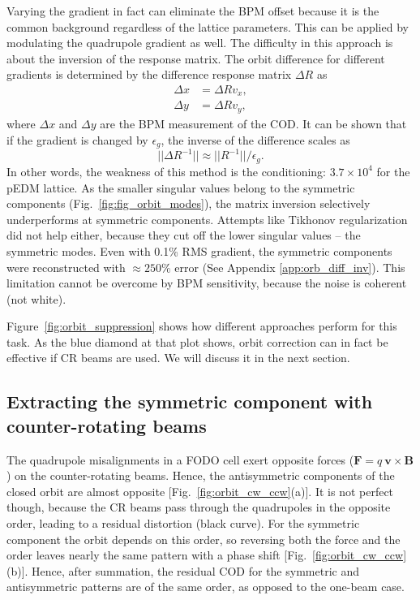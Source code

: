 \documentclass[aps,prab,reprint,superscriptaddress,nofootinbib]{revtex4-2}
\begin{document}
	Varying the gradient in fact can eliminate the BPM offset because it is the common background regardless of the lattice parameters. This can be applied by modulating the quadrupole gradient as well. The difficulty in this approach is about the inversion of the response matrix.
	The orbit difference for different gradients is determined by the difference response matrix $\Delta R$ as
	\begin{equation}
		\begin{split}
			\Delta x &= \Delta R v_x, \\
			\Delta y &= \Delta R v_y,
		\end{split}
	\end{equation}
	where $\Delta x$ and $\Delta y$ are the BPM measurement of the COD. It can be shown that if the gradient is changed by $\epsilon_g$, the inverse of the difference scales as
	\[\vert \vert \Delta R^{-1} \vert \vert \approx \vert \vert R^{-1} \vert \vert / \epsilon_g. \]
	In other words, the weakness of this method is the conditioning: $3.7 \times 10^{4}$ for the pEDM lattice. As the smaller singular values belong to the symmetric components (Fig.~\ref{fig:fig_orbit_modes}), the matrix inversion selectively underperforms at symmetric components. Attempts like Tikhonov regularization~\cite{tikhonov1977} did not help either, because they cut off the lower singular values -- the symmetric modes. Even with 0.1\% RMS gradient, the symmetric components were reconstructed with $\approx 250\%$ error (See Appendix \ref{app:orb_diff_inv}). This limitation cannot be overcome by BPM sensitivity, because the noise is coherent (not white).

	Figure~\ref{fig:orbit_suppression} shows how different approaches perform for this task. As the blue diamond at that plot shows, orbit correction can in fact be effective if CR beams are used. We will discuss it in the next section.

	\subsection{Extracting the symmetric component with counter-rotating beams}
	\label{sec:extract}
	The quadrupole misalignments in a FODO cell exert opposite forces ($\bm F=q~\bm v \times \bm B$) on the counter-rotating beams. Hence, the antisymmetric components of the closed orbit are almost opposite [Fig.~\ref{fig:orbit_cw_ccw}(a)]. It is not perfect though, because the CR beams pass through the quadrupoles in the opposite order, leading to a residual distortion (black curve). For the symmetric component the orbit depends on this order, so reversing both the force and the order leaves nearly the same pattern with a phase shift [Fig.~\ref{fig:orbit_cw_ccw}(b)]. Hence, after summation, the residual COD for the symmetric and antisymmetric patterns are of the same order, as opposed to the one-beam case.
\end{document}
